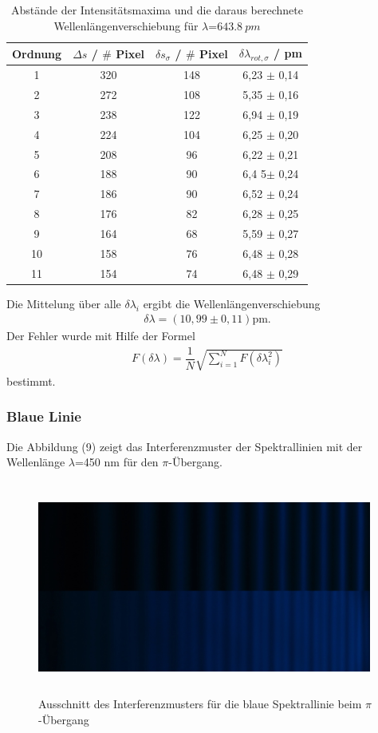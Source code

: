 \documentclass{article}
\begin{document}
	
\begin{table} [H]
	\centering
		\caption{Abstände der Intensitätsmaxima und die daraus berechnete Wellenlängenverschiebung für $\lambda$=$\SI{643,8}{pm}$}
		\label {tab:threecols}
			\begin{tabular}{c|c|c|c} \hline		
		Ordnung & $\Delta s$ / $\#$ Pixel& $\delta s _{\sigma}$ / $\#$ Pixel& $\delta\lambda_{rot,\sigma}$ / pm \\ 
		\hline 
		1 & 320& 148& 6,23 $\pm$ 0,14 \\
		2 & 272 & 108& 5,35 $\pm$ 0,16 \\
		3 & 238 & 122 & 6,94 $\pm$ 0,19 \\
		4 & 224& 104& 6,25 $\pm$ 0,20 \\
		5 & 208& 96& 6,22 $\pm$ 0,21 \\
		6 & 188& 90& 6,4 5$\pm$ 0,24 \\
		7 & 186& 90& 6,52 $\pm$ 0,24\\
		8 & 176& 82& 6,28 $\pm$ 0,25 \\
		9 & 164& 68& 5,59 $\pm$ 0,27 \\
		10 & 158& 76& 6,48 $\pm$ 0,28\\
		11 & 154& 74& 6,48 $\pm$ 0,29 \\
		 
		
		\hline
	\end{tabular} 	
	
	\label {tab:threecols}
\end{table}
Die Mittelung über alle $\delta \lambda_i$ ergibt die Wellenlängenverschiebung 
\begin{align*}
\delta\lambda= (10,99\pm 0,11) \text{pm}.
\end{align*}
Der Fehler wurde mit Hilfe der Formel
\begin{align}
F(\delta \lambda)=\dfrac{1}{N}\sqrt{\sum_{i=1}^{N}F(\delta\lambda_i^2)}
\end{align}
bestimmt. 

\subsubsection{Blaue Linie}
Die Abbildung (9) zeigt das Interferenzmuster der Spektrallinien mit der Wellenlänge $\lambda$=450 nm für den $\pi$-Übergang. 

\begin{figure}[H]
	\centering
	\includegraphics[height=7cm,width=11cm]{vergleichblaue1linie.jpg}
	\caption{ Ausschnitt des Interferenzmusters für die blaue Spektrallinie beim $\pi$-Übergang}
	\label{fig: abb. 1}
\end{figure} 
\end{document}
